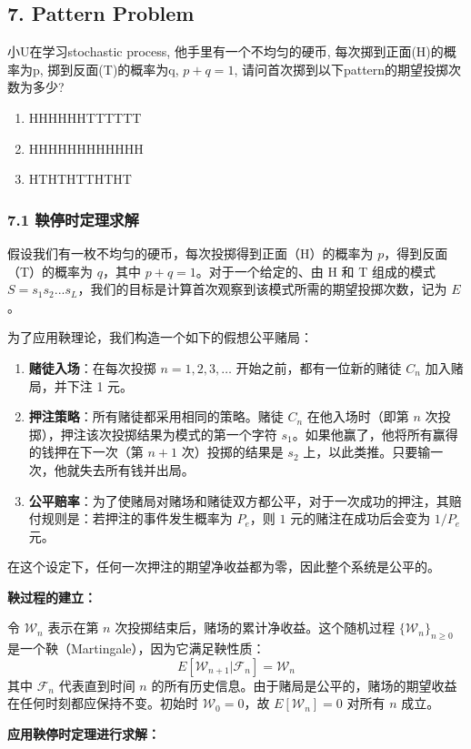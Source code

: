 \documentclass[UTF8]{ctexart}
\begin{document}
\subsection*{7. Pattern Problem}
小U在学习stochastic process, 他手里有一个不均匀的硬币, 每次掷到正面(H)的概率为p, 掷到反面(T)的概率为q, $p+q=1$, 请问首次掷到以下pattern的期望投掷次数为多少?
\begin{enumerate}
    \item HHHHHHTTTTTT
    \item HHHHHHHHHHHH
    \item HTHTHTTHTHT
\end{enumerate}

\subsubsection*{7.1 鞅停时定理求解}
假设我们有一枚不均匀的硬币，每次投掷得到正面（H）的概率为 $p$，得到反面（T）的概率为 $q$，其中 $p+q=1$。对于一个给定的、由 H 和 T 组成的模式 $S = s_1s_2...s_L$，我们的目标是计算首次观察到该模式所需的期望投掷次数，记为 $E$。

为了应用鞅理论，我们构造一个如下的假想公平赌局：
\begin{enumerate}
    \item \textbf{赌徒入场}：在每次投掷 $n=1, 2, 3, \dots$ 开始之前，都有一位新的赌徒 $C_n$ 加入赌局，并下注 1 元。
    \item \textbf{押注策略}：所有赌徒都采用相同的策略。赌徒 $C_n$ 在他入场时（即第 $n$ 次投掷），押注该次投掷结果为模式的第一个字符 $s_1$。如果他赢了，他将所有赢得的钱押在下一次（第 $n+1$ 次）投掷的结果是 $s_2$ 上，以此类推。只要输一次，他就失去所有钱并出局。
    \item \textbf{公平赔率}：为了使赌局对赌场和赌徒双方都公平，对于一次成功的押注，其赔付规则是：若押注的事件发生概率为 $P_e$，则 $1$ 元的赌注在成功后会变为 $1/P_e$ 元。
\end{enumerate}
在这个设定下，任何一次押注的期望净收益都为零，因此整个系统是公平的。


\textbf{鞅过程的建立：}

令 $\mathcal{W}_n$ 表示在第 $n$ 次投掷结束后，赌场的累计净收益。这个随机过程 $\{\mathcal{W}_n\}_{n \ge 0}$ 是一个鞅（Martingale），因为它满足鞅性质：
$$ E[\mathcal{W}_{n+1} | \mathcal{F}_n] = \mathcal{W}_n $$
其中 $\mathcal{F}_n$ 代表直到时间 $n$ 的所有历史信息。由于赌局是公平的，赌场的期望收益在任何时刻都应保持不变。初始时 $\mathcal{W}_0 = 0$，故 $E[\mathcal{W}_n] = 0$ 对所有 $n$ 成立。

\textbf{应用鞅停时定理进行求解：}
\end{document}
